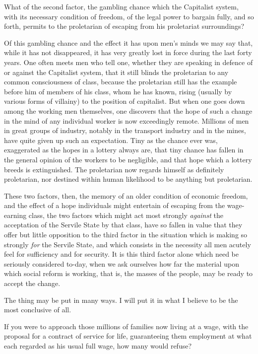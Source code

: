 \documentclass{book}
\begin{document}
What of the second factor, the gambling chance which the Capitalist system, with its necessary condition of freedom, of the legal power to bargain fully, and so forth, permits to the proletarian of escaping from his proletariat surroundings?

Of this gambling chance and the effect it has upon men’s minds we may say that, while it has not disappeared, it has very greatly lost in force during the last forty years. One often meets men who tell one, whether they are speaking in defence of or against the Capitalist system, that it still blinds the proletarian to any common consciousness of class, because the proletarian still has the example before him of members of his class, whom he has known, rising (usually by various forms of villainy) to the position of capitalist. But when one goes down among the working men themselves, one discovers that the hope of such a change in the mind of any individual worker is now exceedingly remote. Millions of men in great groups of industry, notably in the transport industry and in the mines, have quite given up such an expectation. Tiny as the chance ever was, exaggerated as the hopes in a lottery always are, that tiny chance has fallen in the general opinion of the workers to be negligible, and that hope which a lottery breeds is extinguished. The proletarian now regards himself as definitely proletarian, nor destined within human likelihood to be anything but proletarian.

These two factors, then, the memory of an older condition of economic freedom, and the effect of a hope individuals might entertain of escaping from the wage-earning class, the two factors which might act most strongly \emph{against} the acceptation of the Servile State by that class, have so fallen in value that they offer but little opposition to the third factor in the situation which is making so strongly \emph{for} the Servile State, and which consists in the necessity all men acutely feel for sufficiency and for security. It is this third factor alone which need be seriously considered to-day, when we ask ourselves how far the material upon which social reform is working, that is, the masses of the people, may be ready to accept the change.

The thing may be put in many ways. I will put it in what I believe to be the most conclusive of all.

If you were to approach those millions of families now living at a wage, with the proposal for a contract of service for life, guaranteeing them employment at what each regarded as his usual full wage, how many would refuse?
\end{document}
